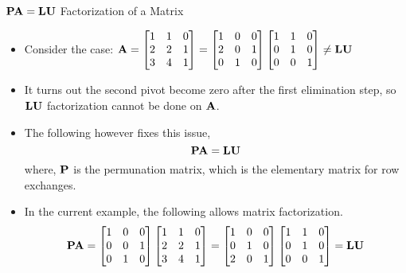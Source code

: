 \documentclass[aspectratio=169]{beamer}
\def\mf{\ensuremath\mathbf}
\begin{document}
\begin{frame}[t]{$\mf{PA = LU}$ Factorization of a Matrix}
\vspace{-0.25cm}

\begin{itemize}
    \item Consider the case: $\mf{A} = \begin{bmatrix*}[r]
    1 & 1 & 0\\
    2 & 2 & 1\\
    3 & 4 & 1
    \end{bmatrix*} = \begin{bmatrix*}[r]
    1 & 0 & 0\\
    2 & 0 & 1\\
    0 & 1 & 0
    \end{bmatrix*} \begin{bmatrix*}[r]
    1 & 1 & 0\\
    0 & 1 & 0\\
    0 & 0 & 1
    \end{bmatrix*} \neq \mf{LU}$
    \item It turns out the second pivot become zero after the first elimination step, so $\mf{LU}$ factorization cannot be done on $\mf{A}$.
    \item The following however fixes this issue,
    \[ \mf{PA = LU} \]
    where, $\mf{P}$ is the permunation matrix, which is the elementary matrix for row exchanges.
    \item In the current example, the following allows matrix factorization.
    \[ \mf{PA} = \begin{bmatrix*}1 & 0 & 0\\ 0 & 0 & 1\\ 0 & 1 & 0\end{bmatrix*}\begin{bmatrix*}[r]
    1 & 1 & 0\\
    2 & 2 & 1\\
    3 & 4 & 1
    \end{bmatrix*} = \begin{bmatrix*}[r]
    1 & 0 & 0\\
    0 & 1 & 0\\
    2 & 0 & 1
    \end{bmatrix*} \begin{bmatrix*}[r]
    1 & 1 & 0\\
    0 & 1 & 0\\
    0 & 0 & 1
    \end{bmatrix*} = \mf{LU} \]
\end{itemize}
\end{frame}
\end{document}
